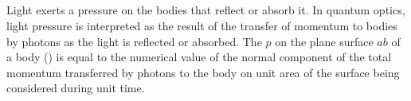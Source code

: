 \subsection{}\label{37.2.3} Light exerts a pressure on the bodies that reflect or absorb it. In quantum optics, light pressure is interpreted as the result of the transfer of momentum to bodies by photons as the light is reflected or
absorbed. The  $p$ on the plane
surface $ab$ of a body () is equal to the numerical value of the normal component of the total momentum transferred by photons to the body on unit area of the surface being considered during unit time.

